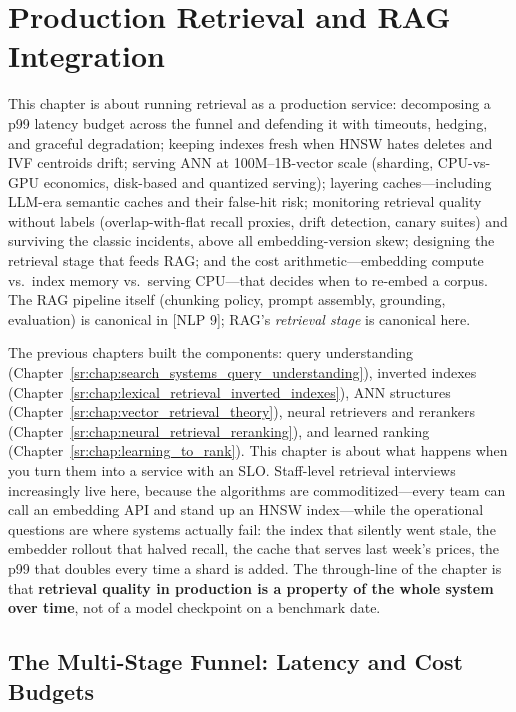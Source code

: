 \chapter{Production Retrieval and RAG Integration}
\label{sr:chap:production_retrieval_rag}

\begin{tldr}
This chapter is about running retrieval as a production service: decomposing a p99 latency budget across the funnel and defending it with timeouts, hedging, and graceful degradation; keeping indexes fresh when HNSW hates deletes and IVF centroids drift; serving ANN at 100M--1B-vector scale (sharding, CPU-vs-GPU economics, disk-based and quantized serving); layering caches---including LLM-era semantic caches and their false-hit risk; monitoring retrieval quality without labels (overlap-with-flat recall proxies, drift detection, canary suites) and surviving the classic incidents, above all embedding-version skew; designing the retrieval stage that feeds RAG; and the cost arithmetic---embedding compute vs.\ index memory vs.\ serving CPU---that decides when to re-embed a corpus. The RAG pipeline itself (chunking policy, prompt assembly, grounding, evaluation) is canonical in [NLP 9]; RAG's \textit{retrieval stage} is canonical here.
\end{tldr}

The previous chapters built the components: query understanding (Chapter~\ref{sr:chap:search_systems_query_understanding}), inverted indexes (Chapter~\ref{sr:chap:lexical_retrieval_inverted_indexes}), ANN structures (Chapter~\ref{sr:chap:vector_retrieval_theory}), neural retrievers and rerankers (Chapter~\ref{sr:chap:neural_retrieval_reranking}), and learned ranking (Chapter~\ref{sr:chap:learning_to_rank}). This chapter is about what happens when you turn them into a service with an SLO. Staff-level retrieval interviews increasingly live here, because the algorithms are commoditized---every team can call an embedding API and stand up an HNSW index---while the operational questions are where systems actually fail: the index that silently went stale, the embedder rollout that halved recall, the cache that serves last week's prices, the p99 that doubles every time a shard is added. The through-line of the chapter is that \textbf{retrieval quality in production is a property of the whole system over time}, not of a model checkpoint on a benchmark date.

\section{The Multi-Stage Funnel: Latency and Cost Budgets}
\label{sr:sec:prod_funnel_budgets}


